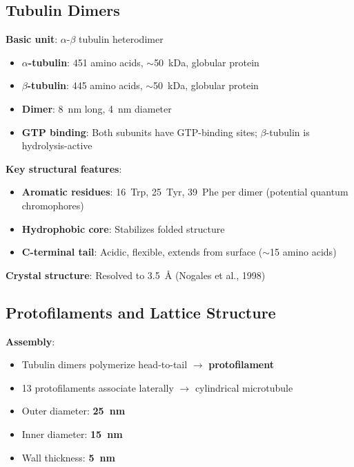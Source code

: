 \subsection{Tubulin Dimers}
\label{subsec:tubulin-dimers}

\textbf{Basic unit}: $\alpha$-$\beta$ tubulin heterodimer
\begin{itemize}
\item \textbf{$\alpha$-tubulin}: 451 amino acids, $\sim$50~kDa, globular protein
\item \textbf{$\beta$-tubulin}: 445 amino acids, $\sim$50~kDa, globular protein
\item \textbf{Dimer}: 8~nm long, 4~nm diameter
\item \textbf{GTP binding}: Both subunits have GTP-binding sites; $\beta$-tubulin is hydrolysis-active
\end{itemize}

\textbf{Key structural features}:
\begin{itemize}
\item \textbf{Aromatic residues}: 16~Trp, 25~Tyr, 39~Phe per dimer (potential quantum chromophores)
\item \textbf{Hydrophobic core}: Stabilizes folded structure
\item \textbf{C-terminal tail}: Acidic, flexible, extends from surface ($\sim$15 amino acids)
\end{itemize}

\textbf{Crystal structure}: Resolved to 3.5~Å (Nogales et al., 1998)

\subsection{Protofilaments and Lattice Structure}
\label{subsec:protofilaments-lattice}

\textbf{Assembly}:
\begin{itemize}
\item Tubulin dimers polymerize head-to-tail $\rightarrow$ \textbf{protofilament}
\item 13 protofilaments associate laterally $\rightarrow$ cylindrical microtubule
\item Outer diameter: \textbf{25~nm}
\item Inner diameter: \textbf{15~nm}
\item Wall thickness: \textbf{5~nm}
\end{itemize}

